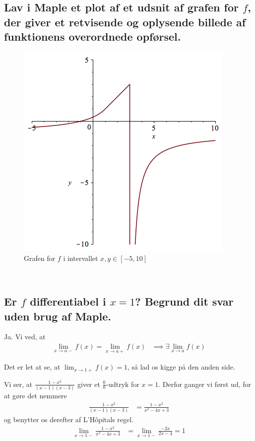 \documentclass[11pt,a4paper]{article}
\newcommand{\limit}[2]{\lim_{#1 \rightarrow #2}}
\begin{document}
\begin{multicols}{2}
    \subsection
    {
        \mdseries
        Lav i Maple et plot af et udsnit af grafen for $f$, der giver et
        retvisende og oplysende billede af funktionens overordnede opførsel.
    }

    \begin{figure}[H]
        \includegraphics[scale=0.5]{figures/3-2a-1.png}
        \caption{Grafen for $f$ i intervallet $x,y \in [-5,10]$}
        \label{fig:3.2a-1}
    \end{figure}

    \vfill{\ }\columnbreak

    \subsection
    {
        \mdseries
        Er $f$ differentiabel i $x=1$? Begrund dit svar uden brug af Maple.
    }
    Ja. Vi ved, at
    \begin{align}
        \limit{x}{a-} f(x) = \limit{x}{a+} f(x)
        &\implies
        \exists \limit{x}{a} f(x)
    \end{align}

    Det er let at se, at $\limit{x}{1+} f(x) = 1$, så lad os kigge på den
    anden side.
    
    Vi ser, at $\frac{1 - x^2}{(x - 1)(x - 3)}$ giver et $\frac{0}{0}$-udtryk
    for $x = 1$. Derfor ganger vi først ud, for at gøre det nemmere
    \begin{align}
        \frac{1 - x^2}{(x - 1)(x - 3)} &= \frac{1 - x^2}{x^2 - 4x + 3}
    \end{align}
    og benytter os derefter af L'Hôpitals regel.
    \begin{align}
        \limit{x}{1-} \frac{1 - x^2}{x^2 - 4x + 3} &=
        \limit{x}{1-} \frac{-2x}{2x - 4} = 1
    \end{align}


\end{multicols}
\end{document}
